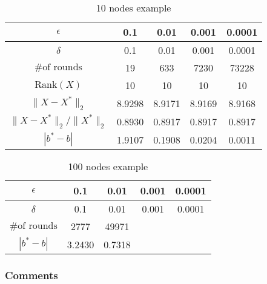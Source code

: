 \documentclass[12pt]{article}
\begin{document}
\begin{table}[htbp]\label{10nodestable}
\centering

\begin{tabular}{||c|c|c|c|c||}
\hline
$\epsilon$ & 0.1 & 0.01 & 0.001 & 0.0001 \\
\hline
$\delta$ & 0.1 & 0.01 & 0.001 & 0.0001 \\
\hline
$\text{\# of rounds}$ & 19 & 633 & 7230 & 73228 \\
\hline
$\text{Rank} (X)$ & 10 & 10 & 10 & 10 \\
\hline
$\|X - X^*\|_2$ & 8.9298 & 8.9171 & 8.9169 & 8.9168 \\
\hline
$\|X - X^*\|_2 / \|X^*\|_2$ & 0.8930 & 0.8917 & 0.8917 & 0.8917 \\
\hline
$|b^* - b|$ & 1.9107 & 0.1908 & 0.0204 & 0.0011 \\
\hline
\end{tabular}
\caption{10 nodes example}
\end{table}

\begin{table}[htbp]\label{100nodestable}
\centering
\begin{tabular}{||c|c|c|c|c||}
\hline
$\epsilon$ & 0.1 & 0.01 & 0.001 & 0.0001 \\
\hline
$\delta$ & 0.1 & 0.01 & 0.001 & 0.0001 \\
\hline
$\text{\# of rounds}$ & 2777 & 49971 &  & \\
\hline
$|b^* - b|$ & 3.2430 & 0.7318 &  & \\
\hline
\end{tabular}
\caption{100 nodes example}
\end{table}



\subsubsection{Comments}
\end{document}
